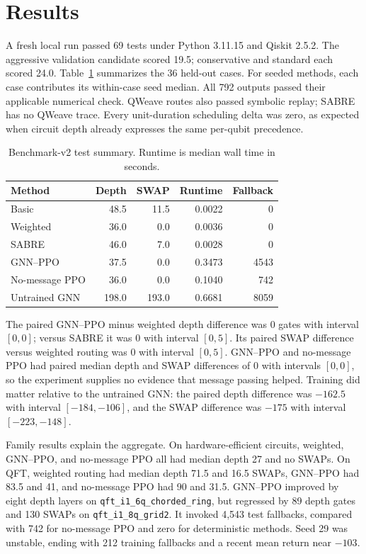 \documentclass[a4paper,11pt,twocolumn]{article}
\begin{document}
\section{Results}
A fresh local run passed 69 tests under Python 3.11.15 and Qiskit 2.5.2. The
aggressive validation candidate scored 19.5; conservative and standard each
scored 24.0. Table~\ref{tab:test-results} summarizes the 36 held-out cases.
For seeded methods, each case contributes its within-case seed median. All 792
outputs passed their applicable numerical check. QWeave routes also passed
symbolic replay; SABRE has no QWeave trace. Every unit-duration scheduling
delta was zero, as expected when circuit depth already expresses the same
per-qubit precedence.

\begin{table}[t]
\centering
\caption{Benchmark-v2 test summary. Runtime is median wall time in seconds.}
\label{tab:test-results}
\small
\begin{tabular}{lrrrr}
\toprule
Method & Depth & SWAP & Runtime & Fallback \\
\midrule
Basic & 48.5 & 11.5 & 0.0022 & 0 \\
Weighted & 36.0 & 0.0 & 0.0036 & 0 \\
SABRE & 46.0 & 7.0 & 0.0028 & 0 \\
GNN--PPO & 37.5 & 0.0 & 0.3473 & 4543 \\
No-message PPO & 36.0 & 0.0 & 0.1040 & 742 \\
Untrained GNN & 198.0 & 193.0 & 0.6681 & 8059 \\
\bottomrule
\end{tabular}
\end{table}

The paired GNN--PPO minus weighted depth difference was 0 gates with interval
$[0,0]$; versus SABRE it was 0 with interval $[0,5]$. Its paired SWAP
difference versus weighted routing was 0 with interval $[0,5]$. GNN--PPO and
no-message PPO had paired median depth and SWAP differences of 0 with
intervals $[0,0]$, so the experiment supplies no evidence that message passing
helped. Training did matter relative to the untrained GNN: the paired depth
difference was $-162.5$ with interval $[-184,-106]$, and the SWAP difference
was $-175$ with interval $[-223,-148]$.

Family results explain the aggregate. On hardware-efficient circuits,
weighted, GNN--PPO, and no-message PPO all had median depth 27 and no SWAPs. On
QFT, weighted routing had median depth 71.5 and 16.5 SWAPs, GNN--PPO had 83.5
and 41, and no-message PPO had 90 and 31.5. GNN--PPO improved by eight depth
layers on \texttt{qft\_i1\_6q\_chorded\_ring}, but regressed by 89 depth gates
and 130 SWAPs on \texttt{qft\_i1\_8q\_grid2}. It invoked 4,543 test
fallbacks, compared with 742 for no-message PPO and zero for deterministic
methods. Seed 29 was unstable, ending with 212 training fallbacks and a recent
mean return near $-103$.
\end{document}
